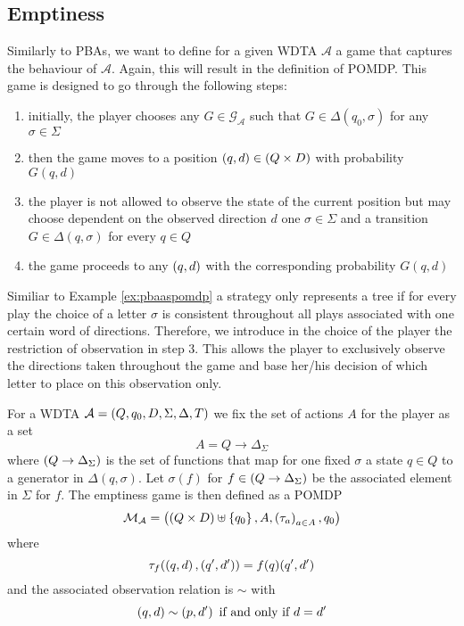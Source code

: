 \subsection{Emptiness}
Similarly to \acp{PBA}, we want to define for a given \ac{WDTA} $\mathcal{A}$
a game that captures the behaviour of $\mathcal{A}$. Again, this will result in
the definition of \ac{POMDP}. This game is designed to go through the following
steps:
\begin{enumerate}
  \item initially, the player chooses any $G\in\mathcal{G}_{\mathcal{A}}$
    such that $G\in\Delta(q_{0},\sigma)$ for any $\sigma\in\Sigma$
  \item then the game moves to a position $\left(q,d\right)\in\left(Q\times D\right)$
    with probability $G(q,d)$
  \item the player is not allowed to observe the state of the current position
    but may choose dependent on the observed direction $d$ one
    $\sigma\in\Sigma$ and a transition $G\in\Delta(q,\sigma)$ for every
    $q\in Q$
  \item the game proceeds to any $\left(q,d\right)$ with the corresponding
    probability $G(q,d)$
\end{enumerate}
Similiar to Example \ref{ex:pbaaspomdp} a strategy only represents a tree if 
for every play the choice of a letter $\sigma$ is consistent throughout all 
plays associated with one certain word of directions. Therefore, we introduce 
in the choice of the player the restriction of observation in step $3$. This 
allows the player to exclusively observe the directions taken throughout the 
game and base her/his decision of which letter to place on this observation 
only.
\begin{definition}
  For a \ac{WDTA} $\mathcal{A} = \left(Q, q_{0}, D, \Sigma, \Delta, T\right)$ we
  fix the set of actions $A$ for the player as a set
  \begin{equation*}
    A = Q\rightarrow\Delta_{\Sigma}
  \end{equation*}
  where $\left(Q\rightarrow\Delta_{\Sigma}\right)$ is the set of functions that map
  for one fixed $\sigma$ a state $q\in Q$ to a generator in $\Delta(q,\sigma)$.
  Let $\sigma(f)$ for $f\in\left(Q\rightarrow\Delta_{\Sigma}\right)$ be the
  associated element in $\Sigma$ for $f$. The emptiness game is then defined as
  a \ac{POMDP}
  \begin{equation*}
    \mathcal{M}_{\mathcal{A}} = \left(\left(Q\times D\right)\uplus \left\{q_{0}\right\}, A,
    \left(\tau_{a}\right)_{a\in A}, q_{0}\right)
  \end{equation*}
  where
  \begin{equation*}
    \tau_{f}(\left(q,d\right),\left(q',d'\right)) = f(q)(q',d')
  \end{equation*}
  and the associated observation relation is $\sim$ with
  \begin{equation*}
    \left(q, d\right)\sim\left(p, d'\right)\text{ if and only if } d = d'
  \end{equation*}
\end{definition}

